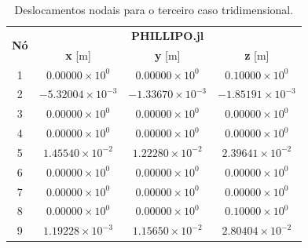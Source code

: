\begin{table}
    \centering
    \caption{Deslocamentos nodais para o terceiro caso tridimensional.}
    \begin{tabular}{c | c c c }
        \toprule
        \multirow{2}{*}{\textbf{Nó}} & \multicolumn{3}{c}{\textbf{PHILLIPO.jl}}  \\
                                     & \textbf{x} [m] & \textbf{y} [m] & \textbf{z} [m]\\                            
        \midrule
        1 & $0.00000 \times 10^{0}$ & $0.00000 \times 10^{0}$ & $0.10000 \times 10^{0}$ \\
        2 & $-5.32004 \times 10^{-3}$ & $-1.33670 \times 10^{-3}$ & $-1.85191 \times 10^{-3}$ \\
        3 & $0.00000 \times 10^{0}$ & $0.00000 \times 10^{0}$ & $0.00000 \times 10^{0}$ \\
        4 & $0.00000 \times 10^{0}$ & $0.00000 \times 10^{0}$ & $0.00000 \times 10^{0}$ \\
        5 & $1.45540 \times 10^{-2}$ & $1.22280 \times 10^{-2}$ & $2.39641 \times 10^{-2}$ \\
        6 & $0.00000 \times 10^{0}$ & $0.00000 \times 10^{0}$ & $0.00000 \times 10^{0}$ \\
        7 & $0.00000 \times 10^{0}$ & $0.00000 \times 10^{0}$ & $0.00000 \times 10^{0}$ \\
        8 & $0.00000 \times 10^{0}$ & $0.00000 \times 10^{0}$ & $0.10000 \times 10^{0}$ \\
        9 & $1.19228 \times 10^{-3}$ & $1.15650 \times 10^{-2}$ & $2.80404 \times 10^{-2}$ \\
        \bottomrule
    \end{tabular}
    \label{tab:verificacao_cubo_3_deslocamentos}
\end{table}

